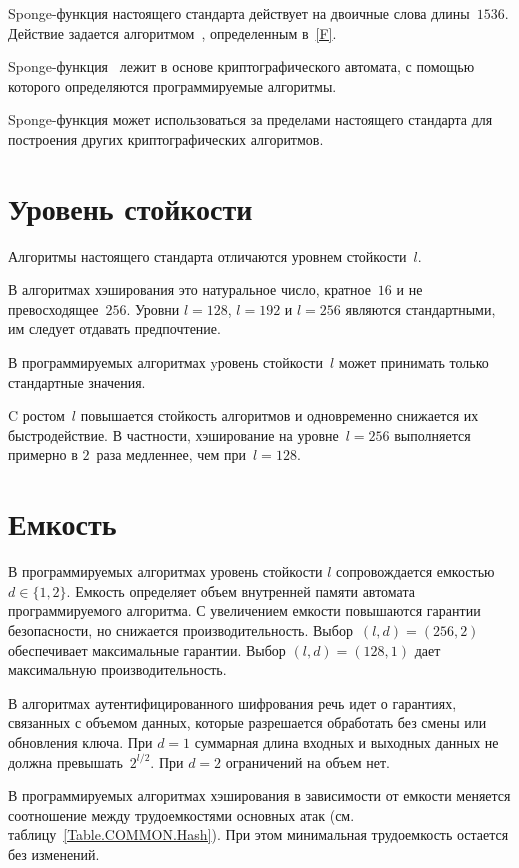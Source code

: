 Sponge-функция настоящего стандарта действует на двоичные слова длины~$1536$.  
Действие задается алгоритмом~, определенным в~\ref{F}. 

Sponge-функция~ лежит в основе криптографического автомата,
с помощью которого определяются программируемые алгоритмы.

Sponge-функция может использоваться за пределами настоящего стандарта для 
построения других криптографических алгоритмов. 

\section{Уровень стойкости}\label{COMMON.Strength}

Алгоритмы настоящего стандарта отличаются уровнем стойкости~$l$. 

В алгоритмах хэширования это натуральное число, кратное~$16$ и 
не превосходящее~$256$. Уровни $l=128$, $l=192$ и $l=256$
являются стандартными, им следует отдавать предпочтение.

В программируемых алгоритмах yровень стойкости~$l$ 
может принимать только стандартные значения. 

C ростом~$l$ повышается стойкость алгоритмов и одновременно снижается 
их быстродействие. В частности, хэширование на уровне~$l=256$ выполняется 
примерно в $2$~раза медленнее, чем при~$l=128$.

\section{Емкость}\label{COMMON.Capacity}

В программируемых алгоритмах уровень стойкости $l$ сопровождается емкостью 
$d\in\{1,2\}$. Емкость определяет объем внутренней памяти автомата 
программируемого алгоритма. 
%
С увеличением емкости повышаются гарантии безопасности, 
но снижается производительность. 
%
Выбор~$(l,d)=(256,2)$ обеспечивает максимальные гарантии.
Выбор $(l,d)=(128,1)$ дает максимальную производительность. 

В алгоритмах аутентифицированного шифрования речь идет о гарантиях, 
связанных с объемом данных, которые разрешается обработать без смены 
или обновления ключа. 
%
При $d=1$ суммарная длина входных и выходных данных не должна 
превышать~$2^{l/2}$.
%
При $d=2$ ограничений на объем нет. 

В программируемых алгоритмах хэширования в зависимости от емкости 
меняется соотношение между трудоемкостями основных атак 
(см. таблицу~\ref{Table.COMMON.Hash}). При этом минимальная трудоемкость
остается без изменений.

